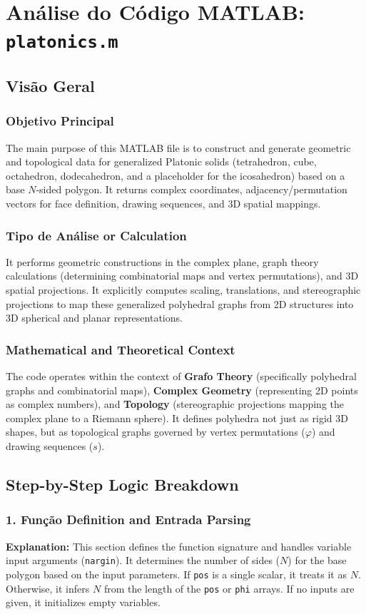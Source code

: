
\chapter{Análise do Código MATLAB: \texttt{platonics.m}}
\section{Visão Geral}

\subsection{Objetivo Principal}
The main purpose of this MATLAB file is to construct and generate geometric and topological data for generalized Platonic solids (tetrahedron, cube, octahedron, dodecahedron, and a placeholder for the icosahedron) based on a base $N$-sided polygon. It returns complex coordinates, adjacency/permutation vectors for face definition, drawing sequences, and 3D spatial mappings.

\subsection{Tipo de Análise or Calculation}
It performs geometric constructions in the complex plane, graph theory calculations (determining combinatorial maps and vertex permutations), and 3D spatial projections. It explicitly computes scaling, translations, and stereographic projections to map these generalized polyhedral graphs from 2D structures into 3D spherical and planar representations.

\subsection{Mathematical and Theoretical Context}
The code operates within the context of \textbf{Grafo Theory} (specifically polyhedral graphs and combinatorial maps), \textbf{Complex Geometry} (representing 2D points as complex numbers), and \textbf{Topology} (stereographic projections mapping the complex plane to a Riemann sphere). It defines polyhedra not just as rigid 3D shapes, but as topological graphs governed by vertex permutations ($\varphi$) and drawing sequences ($s$).

\section{Step-by-Step Logic Breakdown}

\subsection{1. Função Definition and Entrada Parsing}
\textbf{Explanation:} 
This section defines the function signature and handles variable input arguments (\texttt{nargin}). It determines the number of sides ($N$) for the base polygon based on the input parameters. If \texttt{pos} is a single scalar, it treats it as $N$. Otherwise, it infers $N$ from the length of the \texttt{pos} or \texttt{phi} arrays. If no inputs are given, it initializes empty variables.

